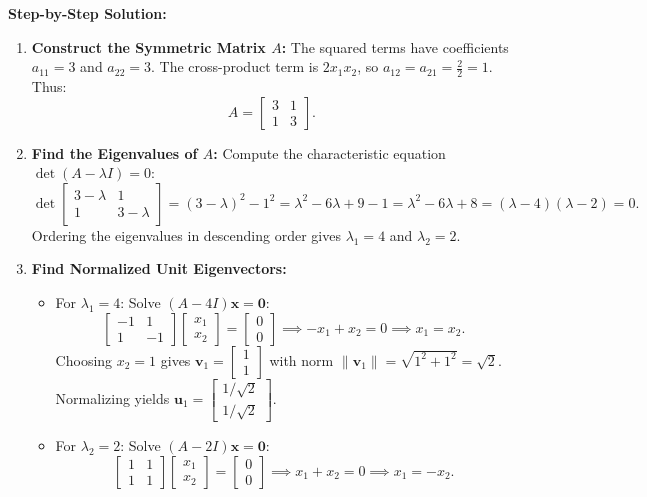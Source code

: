 \documentclass[11pt, letterpaper]{article}
\theoremstyle{definition}
\theoremstyle{remark}
\begin{document}
\textbf{Step-by-Step Solution:}
\begin{enumerate}[leftmargin=2em]
    \item \textbf{Construct the Symmetric Matrix $A$:}
    The squared terms have coefficients $a_{11} = 3$ and $a_{22} = 3$. The cross-product term is $2x_1 x_2$, so $a_{12} = a_{21} = \frac{2}{2} = 1$. Thus:
    \[
    A = \begin{bmatrix} 3 & 1 \\ 1 & 3 \end{bmatrix}.
    \]
    \item \textbf{Find the Eigenvalues of $A$:}
    Compute the characteristic equation $\det(A - \lambda I) = 0$:
    \[
    \det \begin{bmatrix} 3 - \lambda & 1 \\ 1 & 3 - \lambda \end{bmatrix} = (3 - \lambda)^2 - 1^2 = \lambda^2 - 6\lambda + 9 - 1 = \lambda^2 - 6\lambda + 8 = (\lambda - 4)(\lambda - 2) = 0.
    \]
    Ordering the eigenvalues in descending order gives $\lambda_1 = 4$ and $\lambda_2 = 2$.
    \item \textbf{Find Normalized Unit Eigenvectors:}
    \begin{itemize}
        \item For $\lambda_1 = 4$: Solve $(A - 4I)\mathbf{x} = \mathbf{0}$:
        \[
        \begin{bmatrix} -1 & 1 \\ 1 & -1 \end{bmatrix} \begin{bmatrix} x_1 \\ x_2 \end{bmatrix} = \begin{bmatrix} 0 \\ 0 \end{bmatrix} \implies -x_1 + x_2 = 0 \implies x_1 = x_2.
        \]
        Choosing $x_2 = 1$ gives $\mathbf{v}_1 = \begin{bmatrix} 1 \\ 1 \end{bmatrix}$ with norm $\|\mathbf{v}_1\| = \sqrt{1^2 + 1^2} = \sqrt{2}$. Normalizing yields $\mathbf{u}_1 = \begin{bmatrix} 1/\sqrt{2} \\ 1/\sqrt{2} \end{bmatrix}$.
        \item For $\lambda_2 = 2$: Solve $(A - 2I)\mathbf{x} = \mathbf{0}$:
        \[
        \begin{bmatrix} 1 & 1 \\ 1 & 1 \end{bmatrix} \begin{bmatrix} x_1 \\ x_2 \end{bmatrix} = \begin{bmatrix} 0 \\ 0 \end{bmatrix} \implies x_1 + x_2 = 0 \implies x_1 = -x_2.
\]
\end{itemize}
\end{enumerate}
\end{document}
